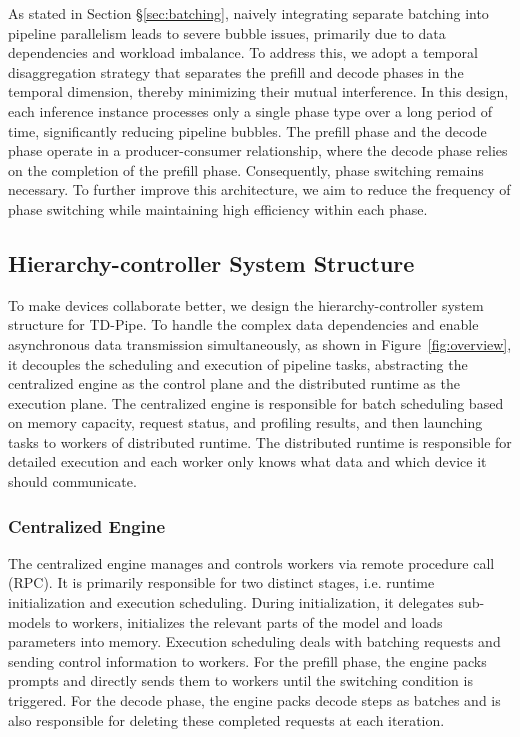 As stated in Section \S \ref{sec:batching}, naively integrating separate batching into pipeline parallelism leads to severe bubble issues, primarily due to data dependencies and workload imbalance.
To address this, we adopt a temporal disaggregation strategy that separates the prefill and decode phases in the temporal dimension, thereby minimizing their mutual interference.
In this design, each inference instance processes only a single phase type over a long period of time, significantly reducing pipeline bubbles.
The prefill phase and the decode phase operate in a producer-consumer relationship, where the decode phase relies on the completion of the prefill phase.
Consequently, phase switching remains necessary.
To further improve this architecture, we aim to reduce the frequency of phase switching while maintaining high efficiency within each phase.


\subsection{Hierarchy-controller System Structure}

To make devices collaborate better, we design the hierarchy-controller system structure for TD-Pipe.
To handle the complex data dependencies and enable asynchronous data transmission simultaneously, as shown in Figure~\ref{fig:overview}, it decouples the scheduling and execution of pipeline tasks, abstracting the centralized engine as the control plane and the distributed runtime as the execution plane.
The centralized engine is responsible for batch scheduling based on memory capacity, request status, and profiling results, and then launching tasks to workers of distributed runtime.
The distributed runtime is responsible for detailed execution and each worker only knows what data and which device it should communicate.

\subsubsection{Centralized Engine}
The centralized engine manages and controls workers via remote procedure call (RPC).
It is primarily responsible for two distinct stages, i.e. runtime initialization and execution scheduling.
During initialization, it delegates sub-models to workers, initializes the relevant parts of the model and loads parameters into memory.
Execution scheduling deals with batching requests and sending control information to workers.
For the prefill phase, the engine packs prompts and directly sends them to workers until the switching condition is triggered.
For the decode phase, the engine packs decode steps as batches and is also responsible for deleting these completed requests at each iteration.

